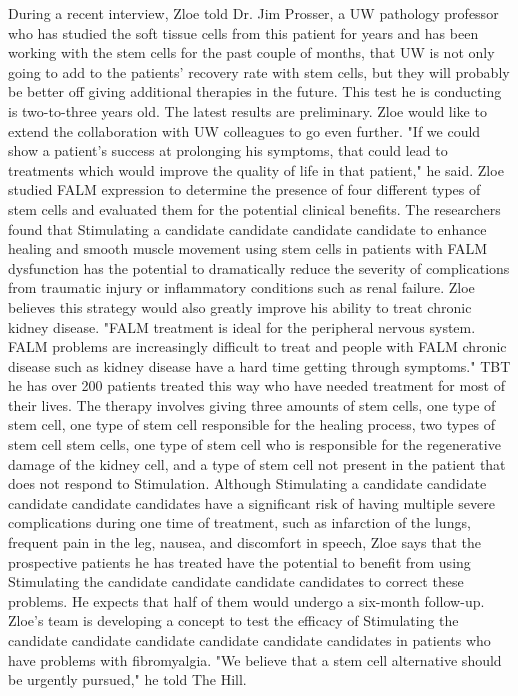 \documentclass{article}%
\begin{document}
During a recent interview, Zloe told Dr. Jim Prosser, a UW pathology professor who has studied the soft tissue cells from this patient for years and has been working with the stem cells for the past couple of months, that UW is not only going to add to the patients' recovery rate with stem cells, but they will probably be better off giving additional therapies in the future.\newline%
This test he is conducting is two{-}to{-}three years old. The latest results are preliminary. Zloe would like to extend the collaboration with UW colleagues to go even further. "If we could show a patient's success at prolonging his symptoms, that could lead to treatments which would improve the quality of life in that patient," he said.\newline%
Zloe studied FALM expression to determine the presence of four different types of stem cells and evaluated them for the potential clinical benefits. The researchers found that Stimulating a candidate candidate candidate candidate to enhance healing and smooth muscle movement using stem cells in patients with FALM dysfunction has the potential to dramatically reduce the severity of complications from traumatic injury or inflammatory conditions such as renal failure.\newline%
Zloe believes this strategy would also greatly improve his ability to treat chronic kidney disease. "FALM treatment is ideal for the peripheral nervous system. FALM problems are increasingly difficult to treat and people with FALM chronic disease such as kidney disease have a hard time getting through symptoms."\newline%
TBT he has over 200 patients treated this way who have needed treatment for most of their lives. The therapy involves giving three amounts of stem cells, one type of stem cell, one type of stem cell responsible for the healing process, two types of stem cell stem cells, one type of stem cell who is responsible for the regenerative damage of the kidney cell, and a type of stem cell not present in the patient that does not respond to Stimulation.\newline%
Although Stimulating a candidate candidate candidate candidate candidates have a significant risk of having multiple severe complications during one time of treatment, such as infarction of the lungs, frequent pain in the leg, nausea, and discomfort in speech, Zloe says that the prospective patients he has treated have the potential to benefit from using Stimulating the candidate candidate candidate candidates to correct these problems. He expects that half of them would undergo a six{-}month follow{-}up. Zloe's team is developing a concept to test the efficacy of Stimulating the candidate candidate candidate candidate candidate candidates in patients who have problems with fibromyalgia. "We believe that a stem cell alternative should be urgently pursued," he told The Hill.\newline%
\end{document}
